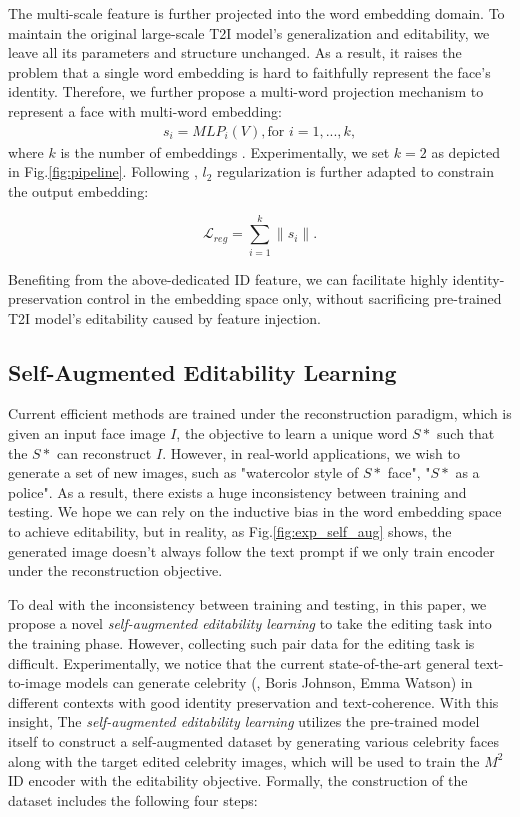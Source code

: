  The multi-scale feature is further projected into the word embedding domain. To maintain the original large-scale T2I model's generalization and editability, we leave all its parameters and structure unchanged. As a result, it raises the problem that a single word embedding is hard to faithfully represent the face's identity. Therefore, we further propose a multi-word projection mechanism to represent a face with multi-word embedding:
\begin{equation}
\begin{aligned}
s_{i} = MLP_i(V), \text{for } i = 1, ..., k,
\end{aligned}
\end{equation}
where $k$ is the number of embeddings . Experimentally, we set $k=2$ as depicted in Fig.\ref{fig:pipeline}.  Following \cite{gal2023designing}, $l_2$ regularization is further adapted to constrain the output embedding:

\begin{equation}
    \mathcal{L}_{reg} = \sum_{i=1}^k{\lVert{s_{i}}\rVert}.
\end{equation}

Benefiting from the above-dedicated ID feature, we can facilitate highly identity-preservation control in the embedding space only, without sacrificing pre-trained T2I model's editability caused by feature injection. 

\subsection{Self-Augmented Editability  
 Learning}
Current efficient methods are trained under the reconstruction paradigm, which is given an input face image $I$, the objective to learn a unique word $S*$ such that the $S*$ can reconstruct $I$. However, in real-world applications, we wish to generate a set of new images, such as "watercolor style of $S*$ face", "$S*$ as a police". As a result, there exists a huge inconsistency between training and testing. We hope we can rely on the inductive bias in the word embedding space to achieve editability, but in reality, as Fig.\ref{fig:exp_self_aug} shows, the generated image doesn't always follow the text prompt if we only train encoder under the reconstruction objective. 

To deal with the inconsistency between training and testing, in this paper, we propose a novel \emph{self-augmented editability learning} to take the editing task into the training phase. However, collecting such pair data for the editing task is difficult. Experimentally,  we notice that the current state-of-the-art general text-to-image models can generate celebrity (\eg, Boris Johnson, Emma Watson) in different contexts with good identity preservation and text-coherence. With this insight, The \emph{self-augmented editability learning} utilizes the pre-trained model itself to construct a self-augmented dataset by generating various celebrity faces along with the target edited celebrity images, which will be used to train the $M^2$ ID encoder with the editability objective. Formally, the construction of the dataset includes the following four steps:


